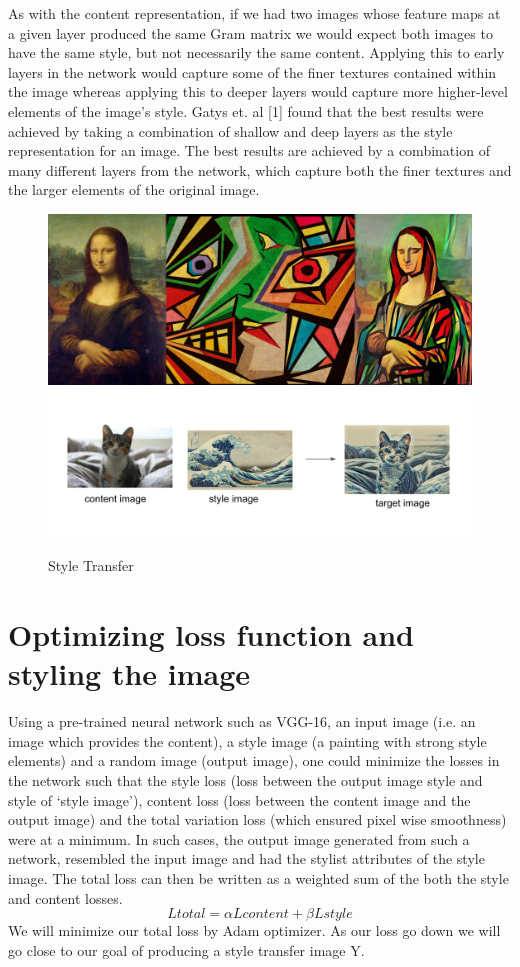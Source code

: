 \begin{styletransfer}
    As with the content representation, if we had two images whose feature maps at a given layer produced the same Gram matrix we would expect both images to have the same style, but not necessarily the same content. Applying this to early layers in the network would capture some of the finer textures contained within the image whereas applying this to deeper layers would capture more higher-level elements of the image’s style. Gatys et. al [1] found that the best results were achieved by taking a combination of shallow and deep layers as the style representation for an image. The best results are achieved by a combination of many different layers from the network, which capture both the finer textures and the larger elements of the original image.
    \begin{figure}[h]
        \centering
        \includegraphics[width=0.8\linewidth]{styletransfer.png}
         \includegraphics[width=0.8\linewidth]{styletransfercat.png}
        \caption{Style Transfer}
    \end{figure} 

\section{Optimizing loss function and styling the image}
    Using a pre-trained neural network such as VGG-16, an input image (i.e. an image which provides the content), a style image (a painting with strong style elements) and a random image (output image), one could minimize the losses in the network such that the style loss (loss between the output image style and style of ‘style image’), content loss (loss between the content image and the output image) and the total variation loss (which ensured pixel wise smoothness) were at a minimum. In such cases, the output image generated from such a network, resembled the input image and had the stylist attributes of the style image. The total loss can then be written as a weighted sum of the both the style and content losses. 
    \[Ltotal = \alpha Lcontent  + \beta Lstyle \]
    We will minimize our total loss by Adam optimizer. As our loss go down we will go close to our goal of producing a style transfer image Y.

\end{styletransfer}

